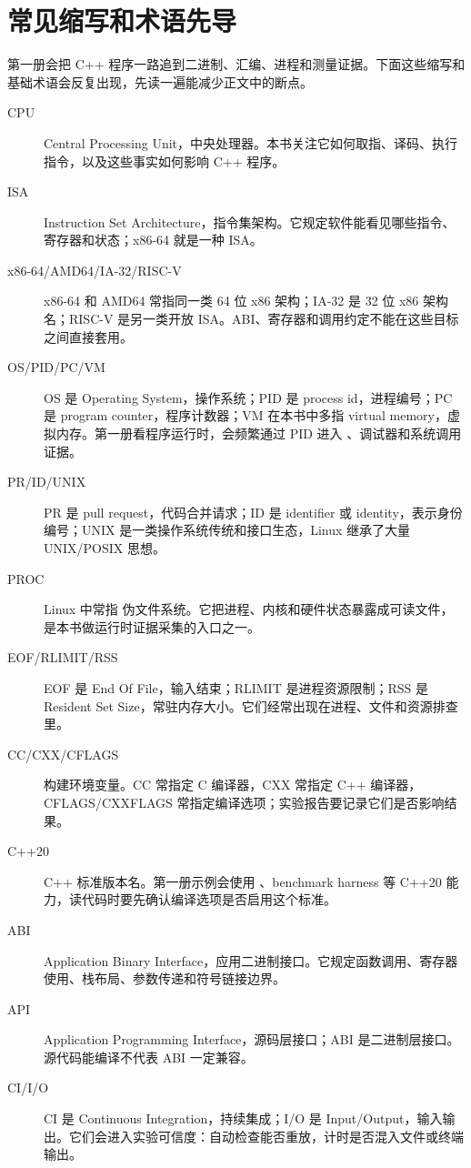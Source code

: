 \chapter*{常见缩写和术语先导}

第一册会把 C++ 程序一路追到二进制、汇编、进程和测量证据。下面这些缩写和基础术语会反复出现，先读一遍能减少正文中的断点。

\begin{description}
  \item[CPU] Central Processing Unit，中央处理器。本书关注它如何取指、译码、执行指令，以及这些事实如何影响 C++ 程序。
  \item[ISA] Instruction Set Architecture，指令集架构。它规定软件能看见哪些指令、寄存器和状态；x86-64 就是一种 ISA。
  \item[x86-64/AMD64/IA-32/RISC-V] x86-64 和 AMD64 常指同一类 64 位 x86 架构；IA-32 是 32 位 x86 架构名；RISC-V 是另一类开放 ISA。ABI、寄存器和调用约定不能在这些目标之间直接套用。
  \item[OS/PID/PC/VM] OS 是 Operating System，操作系统；PID 是 process id，进程编号；PC 是 program counter，程序计数器；VM 在本书中多指 virtual memory，虚拟内存。第一册看程序运行时，会频繁通过 PID 进入 、调试器和系统调用证据。
  \item[PR/ID/UNIX] PR 是 pull request，代码合并请求；ID 是 identifier 或 identity，表示身份编号；UNIX 是一类操作系统传统和接口生态，Linux 继承了大量 UNIX/POSIX 思想。
  \item[PROC] Linux 中常指  伪文件系统。它把进程、内核和硬件状态暴露成可读文件，是本书做运行时证据采集的入口之一。
  \item[EOF/RLIMIT/RSS] EOF 是 End Of File，输入结束；RLIMIT 是进程资源限制；RSS 是 Resident Set Size，常驻内存大小。它们经常出现在进程、文件和资源排查里。
  \item[CC/CXX/CFLAGS] 构建环境变量。CC 常指定 C 编译器，CXX 常指定 C++ 编译器，CFLAGS/CXXFLAGS 常指定编译选项；实验报告要记录它们是否影响结果。
  \item[C++20] C++ 标准版本名。第一册示例会使用 、benchmark harness 等 C++20 能力，读代码时要先确认编译选项是否启用这个标准。
  \item[ABI] Application Binary Interface，应用二进制接口。它规定函数调用、寄存器使用、栈布局、参数传递和符号链接边界。
  \item[API] Application Programming Interface，源码层接口；ABI 是二进制层接口。源代码能编译不代表 ABI 一定兼容。
  \item[CI/I/O] CI 是 Continuous Integration，持续集成；I/O 是 Input/Output，输入输出。它们会进入实验可信度：自动检查能否重放，计时是否混入文件或终端输出。

\end{description}
